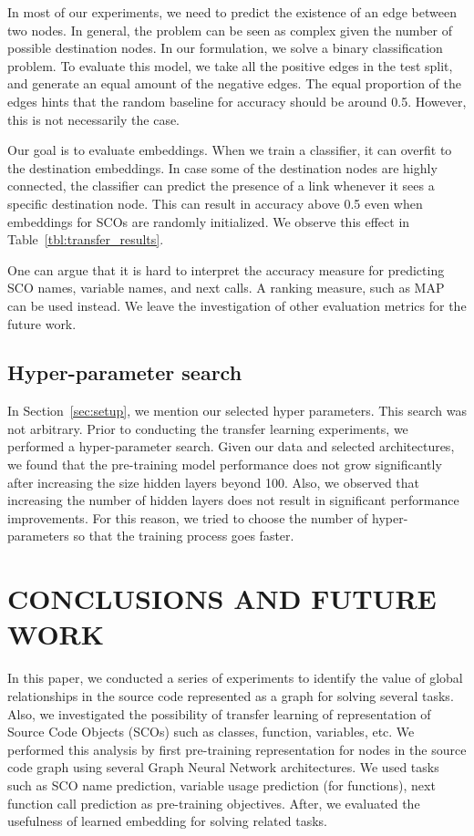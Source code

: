 \documentclass[a4paper,twoside]{article}
\begin{document}
In most of our experiments, we need to predict the existence of an edge between two nodes. In general, the problem can be seen as complex given the number of possible destination nodes. In our formulation, we solve a binary classification problem. To evaluate this model, we take all the positive edges in the test split, and generate an equal amount of the negative edges. The equal proportion of the edges hints that the random baseline for accuracy should be around 0.5. However, this is not necessarily the case. 

Our goal is to evaluate embeddings. When we train a classifier, it can overfit to the destination embeddings. In case some of the destination nodes are highly connected, the classifier can predict the presence of a link whenever it sees a specific destination node. This can result in accuracy above 0.5 even when embeddings for SCOs are randomly initialized. We observe this effect in Table~\ref{tbl:transfer_results}.

One can argue that it is hard to interpret the accuracy measure for predicting SCO names, variable names, and next calls. A ranking measure, such as MAP can be used instead. We leave the investigation of other evaluation metrics for the future work.

\subsection{Hyper-parameter search}

In Section~\ref{sec:setup}, we mention our selected hyper parameters. This search was not arbitrary. Prior to conducting the transfer learning experiments, we performed a hyper-parameter search. Given our data and selected architectures, we found that the pre-training model performance does not grow significantly after increasing the size hidden layers beyond 100. Also, we observed that increasing the number of hidden layers does not result in significant performance improvements. For this reason, we tried to choose the number of hyper-parameters so that the training process goes faster. 

\section{\uppercase{Conclusions and Future Work}}\label{sec:conclusion}

In this paper, we conducted a series of experiments to identify the value of global relationships in the source code represented as a graph for solving several tasks. Also, we investigated the possibility of transfer learning of representation of Source Code Objects (SCOs) such as classes, function, variables, etc. We performed this analysis by first pre-training representation for nodes in the source code graph using several Graph Neural Network architectures. We used tasks such as SCO name prediction, variable usage prediction (for functions), next function call prediction as pre-training objectives. After, we evaluated the usefulness of learned embedding for solving related tasks. 
\end{document}
